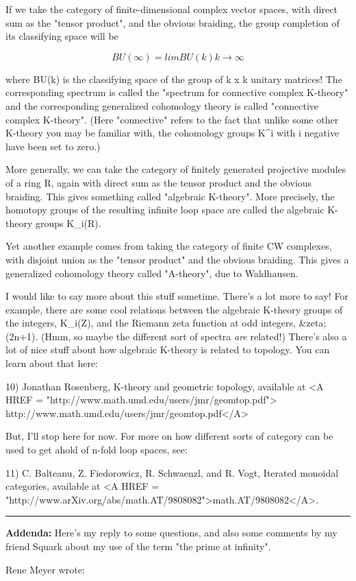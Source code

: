 If we take the category of finite-dimensional complex vector spaces,
with direct sum as the "tensor product", and the obvious
braiding, the group completion of its classifying space will be

$$
BU(\infty ) =   lim        BU(k)
              k \to  \infty 
$$
    

where BU(k) is the classifying space of the group of k x k unitary
matrices!  The corresponding spectrum is called the "spectrum for
connective complex K-theory" and the corresponding generalized
cohomology theory is called "connective complex K-theory".  (Here
"connective" refers to the fact that unlike some other K-theory you
may be familiar with, the cohomology groups K^{i} with i negative have
been set to zero.)

More generally, we can take the category of finitely generated
projective modules of a ring R, again
with direct sum as the tensor product and the obvious braiding.  This
gives something called "algebraic K-theory".  More precisely, the 
homotopy 
groups of the resulting infinite loop space are called the algebraic K-theory
groups K_{i}(R).  

Yet another example comes from taking the category of finite CW
complexes, with disjoint union as the "tensor product" and the obvious
braiding.  This gives a generalized cohomology theory called
"A-theory", due to Waldhausen.

I would like to say more about this stuff sometime.  There's a lot more 
to say!  For example, there are some cool relations between the algebraic 
K-theory groups of the integers, K_{i}(Z), and 
the Riemann zeta function at odd integers, &zeta;(2n+1).
(Hmm, so maybe the different sort of spectra \emph{are} related!)  There's 
also a lot of nice stuff about how algebraic K-theory is related to topology.
You can learn about that here:

10) Jonathan Rosenberg, K-theory and geometric topology, available at
<A HREF = "http://www.math.umd.edu/users/jmr/geomtop.pdf">
http://www.math.umd.edu/users/jmr/geomtop.pdf</A>

But, I'll stop here for now.  For more on how different sorts of category
can be used to get ahold of n-fold loop spaces, see:

11) C. Balteanu, Z. Fiedorowicz, R. Schwaenzl, and R. Vogt, Iterated monoidal 
categories, available at <A HREF = "http://www.arXiv.org/abs/math.AT/9808082">math.AT/9808082</A>.

\par\noindent\rule{\textwidth}{0.4pt}
\textbf{Addenda:} Here's my reply to some questions, and also some comments
by my friend Squark about my use of the term "the prime at infinity".

 Rene Meyer wrote:


